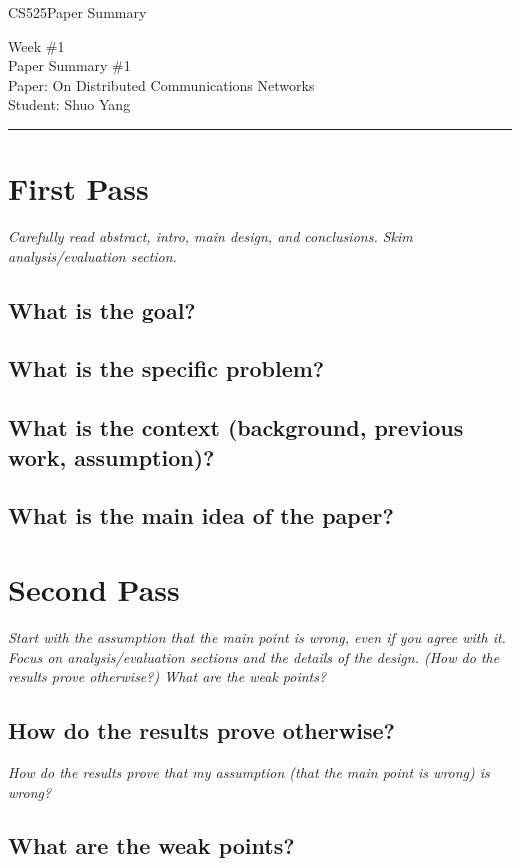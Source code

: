 \documentclass[11pt]{article}
\def\CourseCode{CS525}
\def\WeekNo{1}
\def\PaperNo{1}
\def\Category{Paper Summary}
\def\PaperTitle{On Distributed Communications Networks}
\def\Author{Shuo Yang}
\begin{document}
\noindent

\CourseCode \hfill \Category

\begin{center}
Week \#\WeekNo\\
Paper Summary \#\PaperNo\\
Paper: \PaperTitle\\
Student: \Author\\
\end{center}

\hrule\smallskip

\section{First Pass}

\emph{Carefully read abstract, intro, main design, and
  conclusions. Skim analysis/evaluation section.}

\subsection{What is the goal?}

\subsection{What is the specific problem?}

\subsection{What is the context (background, previous work,
  assumption)?} 

\subsection{What is the main idea of the paper?}

\section{Second Pass}

\emph{Start with the assumption that the main point is wrong, even if
  you agree with it. Focus on analysis/evaluation sections and the
  details of the design. (How do the results prove otherwise?) What
  are the weak points?}

\subsection{How do the results prove otherwise?}
\emph{How do the results prove that my assumption (that the main point
  is wrong) is wrong?}

\subsection{What are the weak points?}
\end{document}
